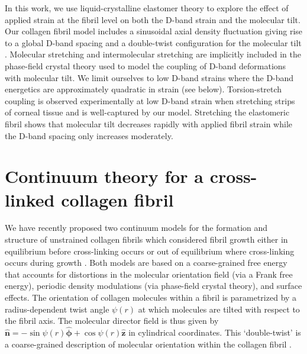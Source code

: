 \documentclass[preprint,12pt]{elsarticle}
\begin{document}
In this work, we use liquid-crystalline elastomer theory to explore the effect of applied strain at the fibril level on both the D-band strain and the molecular tilt. Our collagen fibril model includes a sinusoidal axial density fluctuation giving rise to a global D-band spacing and a double-twist configuration for the molecular tilt \cite{Cameron:2020}. Molecular stretching and intermolecular stretching are implicitly included in the phase-field crystal theory used to model the coupling of D-band deformations with molecular tilt. We limit ourselves to low D-band strains where the D-band energetics are approximately quadratic in strain (see below). Torsion-stretch coupling is observed experimentally at low D-band strain when stretching strips of corneal tissue \cite{Bell:2018} and is well-captured by our model. Stretching the elastomeric fibril shows that molecular tilt decreases rapidly with applied fibril strain while the D-band spacing only increases moderately.  

\section{Continuum theory for a cross-linked collagen fibril}
\label{sec:theory}
We have recently proposed two continuum models for the formation and structure of unstrained collagen fibrils which considered fibril growth either in equilibrium before cross-linking occurs \cite{Cameron:2020} or out of equilibrium where cross-linking occurs during growth \cite{Leighton:2021}. Both models are based on a coarse-grained free energy that accounts for distortions in the molecular orientation field (via a Frank free energy), periodic density modulations (via phase-field crystal theory), and surface effects. The orientation of collagen molecules within a fibril is parametrized by a radius-dependent twist angle $\psi(r)$ at which molecules are tilted with respect to the fibril axis. The molecular director field is thus given by $\hat{\boldsymbol{n}} = -\sin\psi(r) \boldsymbol{\hat{\phi}} + \cos\psi(r) \boldsymbol{\hat{z}}$ in cylindrical coordinates. This `double-twist' is a coarse-grained description of molecular orientation within the collagen fibril \cite{Cameron:2020, Leighton:2021}.
\end{document}
